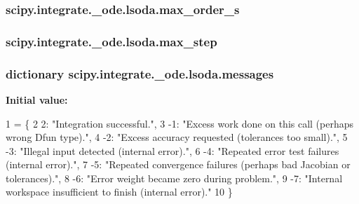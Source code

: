 \subsubsection[{max\+\_\+order\+\_\+s}]{\setlength{\rightskip}{0pt plus 5cm}scipy.\+integrate.\+\_\+ode.\+lsoda.\+max\+\_\+order\+\_\+s}\label{classscipy_1_1integrate_1_1__ode_1_1lsoda_a23b83dd8fc3b1582ba517c94e0658ffc}
\hypertarget{classscipy_1_1integrate_1_1__ode_1_1lsoda_a0e012b5f9897ec558854b9ada86ab112}{}
\subsubsection[{max\+\_\+step}]{\setlength{\rightskip}{0pt plus 5cm}scipy.\+integrate.\+\_\+ode.\+lsoda.\+max\+\_\+step}\label{classscipy_1_1integrate_1_1__ode_1_1lsoda_a0e012b5f9897ec558854b9ada86ab112}
\hypertarget{classscipy_1_1integrate_1_1__ode_1_1lsoda_a3b3af2f561055c55c70c7b6ddfdea9a4}{}
\subsubsection[{messages}]{\setlength{\rightskip}{0pt plus 5cm}dictionary scipy.\+integrate.\+\_\+ode.\+lsoda.\+messages\hspace{0.3cm}{\ttfamily [static]}}\label{classscipy_1_1integrate_1_1__ode_1_1lsoda_a3b3af2f561055c55c70c7b6ddfdea9a4}
{\bfseries Initial value\+:}
\begin{DoxyCode}
1 = \{
2         2: \textcolor{stringliteral}{"Integration successful."},
3         -1: \textcolor{stringliteral}{"Excess work done on this call (perhaps wrong Dfun type)."},
4         -2: \textcolor{stringliteral}{"Excess accuracy requested (tolerances too small)."},
5         -3: \textcolor{stringliteral}{"Illegal input detected (internal error)."},
6         -4: \textcolor{stringliteral}{"Repeated error test failures (internal error)."},
7         -5: \textcolor{stringliteral}{"Repeated convergence failures (perhaps bad Jacobian or tolerances)."},
8         -6: \textcolor{stringliteral}{"Error weight became zero during problem."},
9         -7: \textcolor{stringliteral}{"Internal workspace insufficient to finish (internal error)."}
10     \}
\end{DoxyCode}
\hypertarget{classscipy_1_1integrate_1_1__ode_1_1lsoda_ab20e2737c02e1dfb443a86c0eeba58d3}{}
